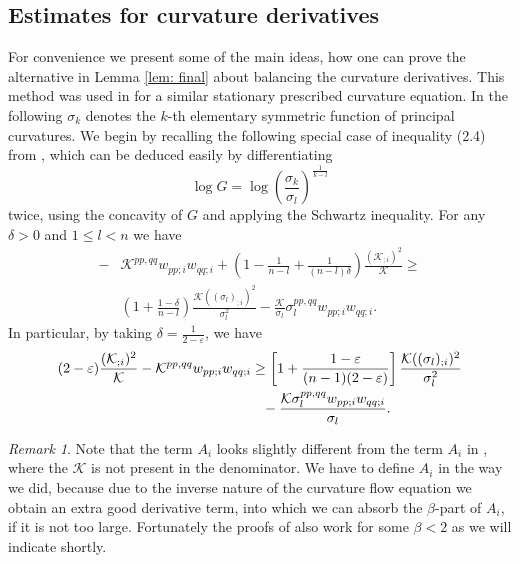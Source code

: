 \documentclass{amsart}
\theoremstyle{definition}
\theoremstyle{remark}
\newtheorem{remark}[theorem]{Remark}
\numberwithin{equation}{section}
\begin{document}
\subsection*{Estimates for curvature derivatives}
For convenience we present some of the main ideas, how one can prove the alternative in Lemma \ref{lem: final} about balancing the curvature derivatives. This method was used in \cite{Guan} for a similar stationary prescribed curvature equation.
In the following $\sigma_k$ denotes the $k$-th elementary symmetric function of principal curvatures. We begin by recalling the following special case of inequality (2.4) from \cite[Lemma 2.2]{Guan}, which can be deduced easily by differentiating
\[\log G=\log \left(\frac{\sigma_k}{\sigma_l}\right)^{\frac{1}{k-l}}\] twice, using the concavity of $G$ and applying the Schwartz inequality.
For any $\delta>0$ and $1\leq l<n$ we have
\begin{align*}
-&\mathcal{K}^{pp,qq}w_{pp;i}w_{qq;i}+\left(1-\frac{1}{n-l}+\frac{1}{(n-l)\delta}\right)\frac{(\mathcal{K}_{;i})^2}{\mathcal{K}}\geq \\
&\left(1+\frac{1-\delta}{n-l}\right)\frac{\mathcal{K}((\sigma_l)_{;i})^2}{\sigma_l^2}-\frac{\mathcal{K}}{\sigma_l}\sigma_l^{pp,qq}w_{pp;i}w_{qq;i}.
\end{align*}
In particular, by taking $\delta=\frac{1}{2-\varepsilon}$, we have
\begin{align}\begin{split}\label{key ineq}
(2-\varepsilon)\frac{(\mathcal{K}_{;i})^2}{\mathcal{K}}-\mathcal{K}^{pp,qq}w_{pp;i}w_{qq;i}&\geq \left[1+\frac{1-\varepsilon}{(n-1)(2-\varepsilon)}\right]\frac{\mathcal{K}((\sigma_l)_{;i})^2}{\sigma_l^2}\\
					&\hphantom{=}-\frac{\mathcal{K}\sigma_l^{pp,qq}w_{pp;i}w_{qq;i}}{\sigma_l}.
\end{split}\end{align}



\begin{remark}
Note that the term $A_i$ looks slightly different from the term $A_i$ in \cite{Guan}, where the $\mathcal{K}$ is not present in the denominator. We have to define $A_i$ in the way we did, because due to the inverse nature of the curvature flow equation we obtain an extra good derivative term, into which we can absorb the $\beta$-part of $A_i$, if it is not too large. Fortunately the proofs of \cite[Lemma~4.2, Lemma~4.3]{Guan} also work for some $\beta<2$ as we will indicate shortly.
\end{remark}
\end{document}
